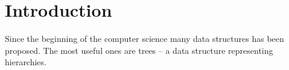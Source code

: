 \chapter*{Introduction}

Since the beginning of the computer science many data structures has been proposed.
The most useful ones are trees -- a data structure representing hierarchies.
